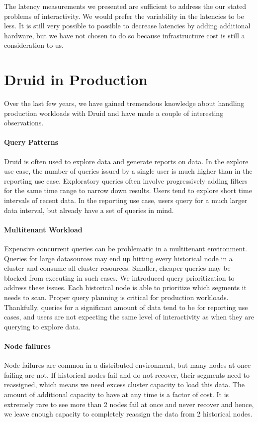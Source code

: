 \documentclass{acm_proc_article-sp}
\begin{document}
The latency measurements we presented are sufficient to address the our stated
problems of interactivity. We would prefer the variability in the latencies to
be less. It is still very possible to possible to decrease latencies by adding
additional hardware, but we have not chosen to do so because infrastructure
cost is still a consideration to us.

\section{Druid in Production}\label{sec:production}
Over the last few years, we have gained tremendous knowledge about handling
production workloads with Druid and have made a couple of interesting observations.

\paragraph{Query Patterns}
Druid is often used to explore data and generate reports on data. In the
explore use case, the number of queries issued by a single user is much higher
than in the reporting use case. Exploratory queries often involve progressively
adding filters for the same time range to narrow down results. Users tend to
explore short time intervals of recent data. In the reporting use case, users
query for a much larger data interval, but already have a set of queries in
mind.

\paragraph{Multitenant Workload}
Expensive concurrent queries can be problematic in a multitenant
environment. Queries for large datasources may end up hitting every historical
node in a cluster and consume all cluster resources. Smaller, cheaper queries
may be blocked from executing in such cases. We introduced query prioritization
to address these issues. Each historical node is able to prioritize which
segments it needs to scan. Proper query planning is critical for production
workloads. Thankfully, queries for a significant amount of data tend to be for
reporting use cases, and users are not expecting the same level of
interactivity as when they are querying to explore data. 

\paragraph{Node failures}
Node failures are common in a distributed environment, but many nodes at
once failing are not. If historical nodes fail and do not recover, their
segments need to reassigned, which means we need excess cluster capacity to
load this data. The amount of additional capacity to have at any time is a
factor of cost. It is extremely rare to see more than 2 nodes fail at once and
never recover and hence, we leave enough capacity to completely reassign the
data from 2 historical nodes. 
\end{document}

